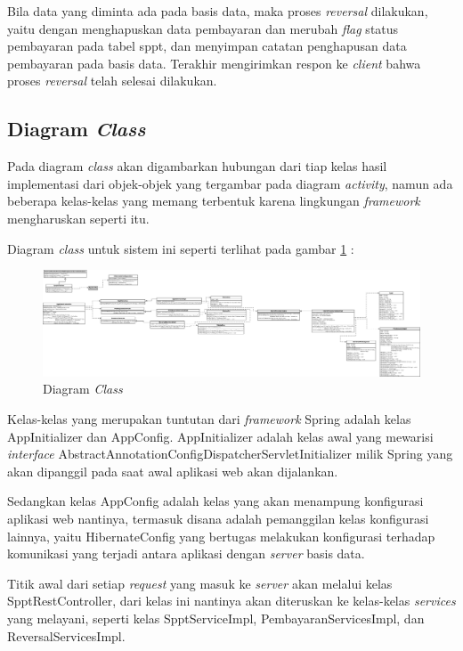 \documentclass[pdftex,12pt, oneside]{article}
\begin{document}
Bila data yang diminta ada pada basis data, maka proses \textit{reversal} dilakukan, yaitu dengan menghapuskan data pembayaran dan merubah \textit{flag} status pembayaran pada tabel sppt, dan menyimpan catatan penghapusan data pembayaran pada basis data. Terakhir mengirimkan respon ke \textit{client} bahwa proses \textit{reversal} telah selesai dilakukan.

\subsection{Diagram \textit{Class}}

Pada diagram \textit{class} akan digambarkan hubungan dari tiap kelas hasil implementasi dari objek-objek yang tergambar pada diagram \textit{activity}, namun ada beberapa kelas-kelas yang memang terbentuk karena lingkungan \textit{framework} mengharuskan seperti itu.

Diagram \textit{class} untuk sistem ini seperti terlihat pada gambar \ref{fig:uml-class} :

\begin{figure}[H]
  \centering
  \includegraphics[width=1\textwidth]{./resources/uml/uml-class}
  \caption{Diagram \textit{Class}}
  \label{fig:uml-class}
\end{figure}

Kelas-kelas yang merupakan tuntutan dari \textit{framework} Spring adalah kelas AppInitializer dan AppConfig. AppInitializer adalah kelas awal yang mewarisi \textit{interface} AbstractAnnotationConfigDispatcherServletInitializer milik Spring yang akan dipanggil pada saat awal aplikasi web akan dijalankan.

Sedangkan kelas AppConfig adalah kelas yang akan menampung konfigurasi aplikasi web nantinya, termasuk disana adalah pemanggilan kelas konfigurasi lainnya, yaitu HibernateConfig yang bertugas melakukan konfigurasi terhadap komunikasi yang terjadi antara aplikasi dengan \textit{server} basis data.

Titik awal dari setiap \textit{request} yang masuk ke \textit{server} akan melalui kelas SpptRestController, dari kelas ini nantinya akan diteruskan ke kelas-kelas \textit{services} yang melayani, seperti kelas SpptServiceImpl, PembayaranServicesImpl, dan ReversalServicesImpl.
\end{document}
